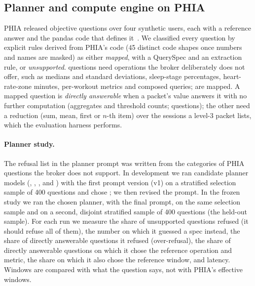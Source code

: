 \subsection{Planner and compute engine on PHIA}\label{sec:phia-design}

PHIA released \phiaTotal{} objective questions over four synthetic users, each with a reference answer and the
pandas code that defines it~\citep{merrill2024phia}. We classified every question by explicit rules derived from
PHIA's code (45 distinct code shapes once numbers and names are masked) as either \emph{mapped}, with a QuerySpec
and an extraction rule, or \emph{unsupported}. \phiaUnsupported{} questions need operations the broker deliberately
does not offer, such as medians and standard deviations, sleep-stage percentages, heart-rate-zone minutes,
per-workout metrics and composed queries; \phiaMapped{} are mapped. A mapped question is \emph{directly answerable}
when a packet's value answers it with no further computation (aggregates and threshold counts; \phiaDirect{}
questions); the other \phiaSessions{} need a reduction (sum, mean, first or $n$-th item) over the sessions a level-3
packet lists, which the evaluation harness performs.

\paragraph{Planner study.} The refusal list in the planner prompt was written from the categories of PHIA questions
the broker does not support. In development we ran \plCandidates{} candidate planner models (,
, ,  and ) with the first prompt
version (v1) on a stratified selection sample of 400 questions and chose ; we then revised the
prompt. In the frozen study we ran the chosen planner,  with the final prompt, on the same
selection sample and on a second, disjoint stratified sample of 400 questions (the held-out sample). For each run we measure the share of unsupported
questions refused (it should refuse all of them), the number on which it guessed a spec instead, the share of
directly answerable questions it refused (over-refusal), the share of directly answerable questions on which it chose
the reference operation and metric, the share on which it also chose the reference window, and latency. Windows are
compared with what the question says, not with PHIA's effective windows.


